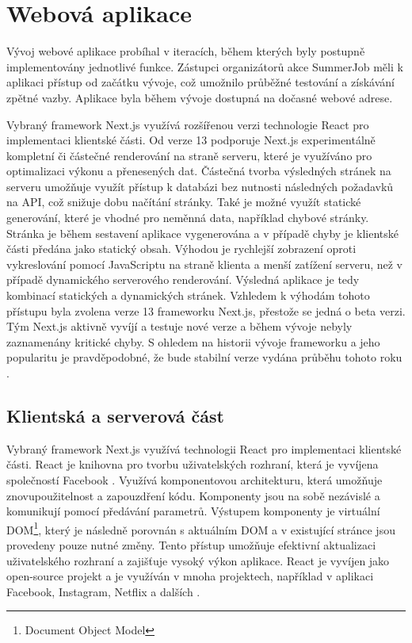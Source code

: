 \section{Webová aplikace}

Vývoj webové aplikace probíhal v iteracích, během kterých byly postupně implementovány jednotlivé funkce. Zástupci organizátorů akce SummerJob
měli k aplikaci přístup od začátku vývoje, což umožnilo průběžné testování a získávání zpětné vazby. Aplikace byla během vývoje dostupná na dočasné webové adrese.

Vybraný framework Next.js využívá rozšířenou verzi technologie React pro implementaci klientské části.
Od verze 13 podporuje Next.js experimentálně kompletní či částečné renderování na straně serveru, které je využíváno pro optimalizaci výkonu a přenesených dat.
Částečná tvorba výsledných stránek na serveru umožňuje využít přístup k databázi bez nutnosti následných požadavků na API, což snižuje dobu načítání stránky.
Také je možné využít statické generování, které je vhodné pro neměnná data, například chybové stránky. Stránka je během sestavení aplikace vygenerována a v případě chyby
je klientské části předána jako statický obsah. Výhodou je rychlejší zobrazení oproti vykreslování pomocí JavaScriptu na straně klienta a menší zatížení serveru, než v případě
dynamického serverového renderování. Výsledná aplikace je tedy kombinací statických a dynamických stránek. Vzhledem k výhodám tohoto přístupu byla zvolena verze 13 frameworku Next.js,
přestože se jedná o beta verzi. Tým Next.js aktivně vyvíjí a testuje nové verze a během vývoje nebyly zaznamenány kritické chyby. S ohledem na historii
vývoje frameworku a jeho popularitu je pravděpodobné, že bude stabilní verze vydána průběhu tohoto roku \cite{nextjs_versions}.

\subsection{Klientská a serverová část}

Vybraný framework Next.js využívá technologii React pro implementaci klientské části. React je knihovna pro tvorbu uživatelských rozhraní, která je vyvíjena
společností Facebook \cite{react}. Využívá komponentovou architekturu, která umožňuje znovupoužitelnost a zapouzdření kódu. Komponenty jsou na sobě nezávislé a
komunikují pomocí předávání parametrů. Výstupem komponenty je virtuální DOM\footnote{Document Object Model}, který je následně porovnán s aktuálním DOM a v existující
stránce jsou provedeny pouze nutné změny. Tento přístup umožňuje efektivní aktualizaci uživatelského rozhraní a zajišťuje vysoký výkon aplikace. React je
vyvíjen jako open-source projekt a je využíván v mnoha projektech, například v aplikaci Facebook, Instagram, Netflix a dalších \cite{react_used}.

